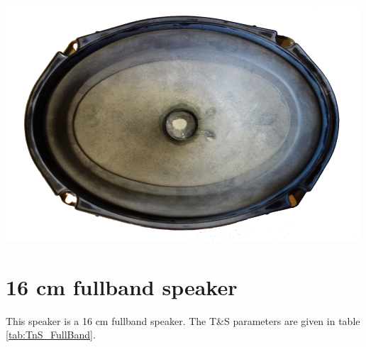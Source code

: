 \documentclass{report}
\begin{document}
\begin{appendices}
\begin{minipage}{0.6\textwidth}
\end{minipage}
\begin{minipage}{0.4\textwidth}
\begin{center}
	\includegraphics[scale=1]{Appendix/Oval_Spkr}
    \captionsetup{hypcap=false}
    \label{fig:spkr_lib_Oval}
\end{center}
\end{minipage}

\section{16 cm fullband speaker}
\label{spkrlib:12cm}

This speaker is a 16 cm fullband speaker. The T\&S parameters are given in table \ref{tab:TnS_FullBand}.


\end{appendices}
\end{document}
